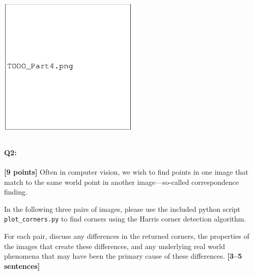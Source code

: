\documentclass[11pt]{article}
\begin{document}
\begin{tcolorbox}[colback=white!5!white,colframe=green!75!black]
\includegraphics[width=0.5\textwidth,height=7cm,keepaspectratio]{images/TODO_part4.png}
\end{tcolorbox}
\pagebreak

\paragraph{Q2:} \textbf{[9 points]} Often in computer vision, we wish to find points in one image that match to the same world point in another image---so-called correspondence finding.

\begin{tcolorbox}[colback=orange!5!white,colframe=orange!75!black]
In the following three pairs of images, please use the included python script \texttt{plot\_corners.py} to find corners using the Harris corner detection algorithm. 

For each pair, discuss any differences in the returned corners, the properties of the images that create these differences, and any underlying real world phenomena that may have been the primary cause of these differences. \textbf{[3--5 sentences]}
\end{tcolorbox}
\end{document}
